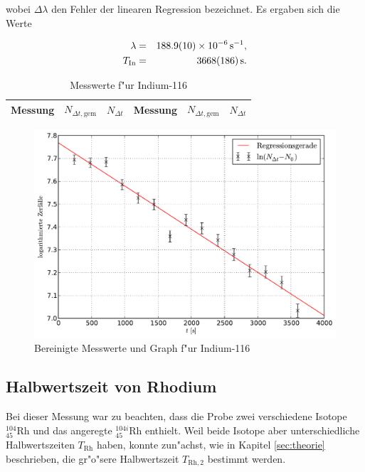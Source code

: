 		wobei $\Delta \lambda$ den Fehler der linearen Regression bezeichnet.
		Es ergaben sich die Werte

		\begin{eqnarray*}
			\lambda & = & \SI{188.9 (10)e-6}{\per \second} , \\
			T_\mathrm{In} & = & \SI{3668 (186)}{\second} .
		\end{eqnarray*}

		\begin{table}[!h]
			\begin{center}
				\label{tabelle:indium}
				\caption{Messwerte f"ur Indium-116}
				\begin{tabular}{|c|c|c||c|c|c|}
					\hline 
					Messung & $N_{\Delta t, \mathrm{gem}}$ & $N_{\Delta t}$ & Messung & $N_{\Delta t, \mathrm{gem}}$ & $N_{\Delta t}$\\
					\hline 
					\hline
					
					\hline 
				\end{tabular}
			\end{center}
		\end{table}

		\begin{figure}[!h]
			\centering
			\includegraphics[width = 15cm]{img/graph_indium_linearisiert.pdf}
			\caption{Bereinigte Messwerte und Graph f"ur Indium-116}
			\label{fig:indium}
		\end{figure}

	\clearpage

	\subsection{Halbwertszeit von Rhodium}
		\label{subsec:rhodium}
		Bei dieser Messung war zu beachten, dass die Probe zwei verschiedene Isotope ${}_{45}^{104}\mathrm{Rh}$ und das angeregte ${}_{45}^{104i}\mathrm{Rh}$ enthielt.
		Weil beide Isotope aber unterschiedliche Halbwertszeiten $T_\mathrm{Rh}$ haben,
		konnte zun"achst, wie in Kapitel \ref{sec:theorie} beschrieben, die gr"o"sere Halbwertszeit $T_{\mathrm{Rh}, 2}$ bestimmt werden.

